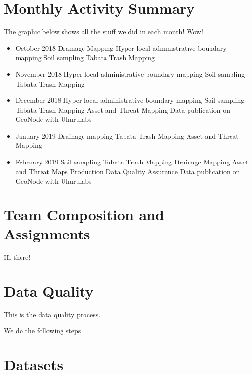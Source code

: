 \documentclass[a4paper,12pt,twoside]{article}
\begin{document}
\begin{multicols}{2}

  \lipsum[5-8]
  
\end{multicols}

\newpage
\section{Monthly Activity Summary}

The graphic below shows all the stuff we did in each month! Wow!

\bigskip

\begin{itemize}
    \item October 2018
Drainage Mapping
Hyper-local administrative boundary mapping
Soil sampling
Tabata Trash Mapping
    \item November 2018
Hyper-local administrative boundary mapping
Soil sampling
Tabata Trash Mapping
    \item December 2018
Hyper-local administrative boundary mapping
Soil sampling
Tabata Trash Mapping
Asset and Threat Mapping
Data publication on GeoNode with Uhurulabs
    \item January 2019
Drainage mapping
Tabata Trash Mapping
Asset and Threat Mapping
    \item February 2019
Soil sampling
Tabata Trash Mapping
Drainage Mapping
Asset and Threat Maps Production
Data Quality Assurance
Data publication on GeoNode with Uhurulabs
\end{itemize}

\section{Team Composition and Assignments}
Hi there!

\section{Data Quality}
This is the data quality process. 

We do the following steps


\section{Datasets}
\end{document}
